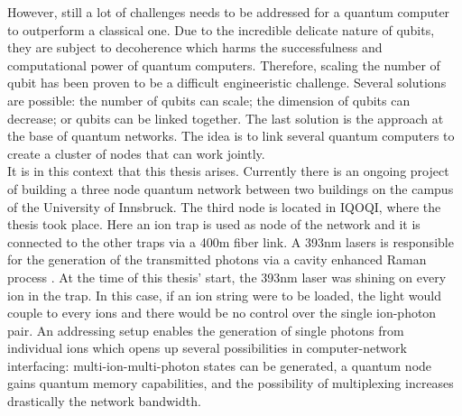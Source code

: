 \documentclass[english, a4paper, 12pt, twoside]{book}
\numberwithin{equation}{section} %
\begin{document}
However, still a lot of challenges needs to be addressed for a quantum computer to outperform a classical one. Due to the incredible delicate nature of qubits, they are subject to decoherence which harms the successfulness and computational power of quantum computers. Therefore, scaling the number of qubit has been proven to be a difficult engineeristic challenge. Several solutions are possible: the number of qubits can scale; the dimension of qubits can decrease; or qubits can be linked together. The last solution is the approach at the base of quantum networks. The idea is to link several quantum computers to create a cluster of nodes that can work jointly.\\
It is in this context that this thesis arises. Currently there is an ongoing project of building a three node quantum network between two buildings on the campus of the University of Innsbruck. The third node is located in IQOQI, where the thesis took place. Here an ion trap is used as node of the network and it is connected to the other traps via a 400m fiber link. A 393nm lasers is responsible for the generation of the transmitted photons via a cavity enhanced Raman process \cite{stuteinterface}. At the time of this thesis' start, the 393nm laser was shining on every ion in the trap. In this case, if an ion string were to be loaded, the light would couple to every ions and there would be no control over the single ion-photon pair. An addressing setup enables the generation of single photons from individual ions which opens up several possibilities in computer-network interfacing: multi-ion-multi-photon states can be generated, a quantum node gains quantum memory capabilities, and the possibility of multiplexing increases drastically the network bandwidth.
\end{document}
